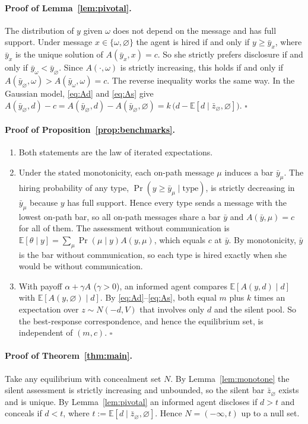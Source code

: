 \documentclass[11pt]{article}
\theoremstyle{definition}
\newcommand{\E}{\mathbb{E}}
\newcommand{\sil}{\varnothing}
\begin{document}
\paragraph{Proof of Lemma~\ref{lem:pivotal}.} The distribution of $y$ given $\omega$ does not depend on the message and has full support. Under message $x\in\{\omega,\sil\}$ the agent is hired if and only if $y\ge\bar y_x$, where $\bar y_x$ is the unique solution of $A(\bar y_x,x)=c$. So she strictly prefers disclosure if and only if $\bar y_\omega<\bar y_\sil$. Since $A(\cdot,\omega)$ is strictly increasing, this holds if and only if $A(\bar y_\sil,\omega)>A(\bar y_\omega,\omega)=c$. The reverse inequality works the same way. In the Gaussian model, \eqref{eq:Ad} and \eqref{eq:As} give $A(\bar y_\sil,d)-c=A(\bar y_\sil,d)-A(\bar y_\sil,\sil)=k\,\big(d-\E[d\mid\bar z_\sil,\sil]\big)$. \hfill$\square$

\paragraph{Proof of Proposition~\ref{prop:benchmarks}.}
\begin{enumerate}[label=(\alph*)]
\item Both statements are the law of iterated expectations.
\item Under the stated monotonicity, each on-path message $\mu$ induces a bar $\bar y_\mu$. The hiring probability of any type, $\Pr(y\ge\bar y_\mu\mid\text{type})$, is strictly decreasing in $\bar y_\mu$ because $y$ has full support. Hence every type sends a message with the lowest on-path bar, so all on-path messages share a bar $\bar y$ and $A(\bar y,\mu)=c$ for all of them. The assessment without communication is $\E[\theta\mid y]=\sum_\mu\Pr(\mu\mid y)A(y,\mu)$, which equals $c$ at $\bar y$. By monotonicity, $\bar y$ is the bar without communication, so each type is hired exactly when she would be without communication.
\item With payoff $\alpha+\gamma A$ ($\gamma>0$), an informed agent compares $\E[A(y,d)\mid d]$ with $\E[A(y,\sil)\mid d]$. By \eqref{eq:Ad}--\eqref{eq:As}, both equal $m$ plus $k$ times an expectation over $z\sim N(-d,V)$ that involves only $d$ and the silent pool. So the best-response correspondence, and hence the equilibrium set, is independent of $(m,c)$. \hfill$\square$
\end{enumerate}

\paragraph{Proof of Theorem~\ref{thm:main}.} Take any equilibrium with concealment set $N$. By Lemma~\ref{lem:monotone} the silent assessment is strictly increasing and unbounded, so the silent bar $\bar z_\sil$ exists and is unique. By Lemma~\ref{lem:pivotal} an informed agent discloses if $d>t$ and conceals if $d<t$, where $t:=\E[d\mid\bar z_\sil,\sil]$. Hence $N=(-\infty,t)$ up to a null set.
\end{document}
